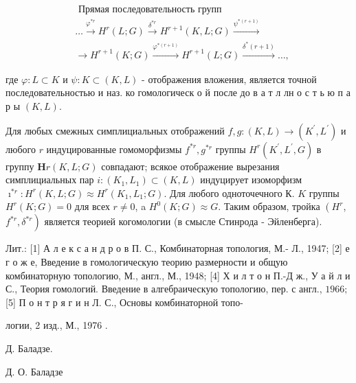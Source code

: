 \documentclass[10pt]{article}
\begin{document}
\[

\begin{aligned}

& \text { Прямая последовательность групп } \\

& \ldots \stackrel{\varphi^{* r}}{\longrightarrow} H^{r}(L ; G) \stackrel{\delta^{* r}}{\longrightarrow} H^{r+1}(K, L ; G) \stackrel{\psi^{*(r+1)}}{\longrightarrow} \\

& \longrightarrow H^{r+1}(K ; G) \stackrel{\varphi^{*(r+1)}}{\longrightarrow} H^{r+1}(L ; G) \stackrel{\delta^{*}(r+1)}{\longrightarrow} \ldots,

\end{aligned}

\]



где $\varphi: L \subset K$ и $\psi: K \subset(K, L)$ - отображения вложения, является точной последовательностью и наз. ко гомологическ о й после до в а т л лн о с т ь ю п а р ы $(K, L)$.



Для любых смежных симплициальных отображений $f, g:(K, L) \rightarrow\left(K^{\prime}, L^{\prime}\right)$ и любого $r$ индуцированные гомоморфизмы $f^{* r}, g^{* r}$ группы $H^{r}\left(K^{\prime}, L^{\prime}, G\right)$ в группу $\boldsymbol{H} r(K, L ; G)$ совпадают; всякое отображение вырезания симплициальных пар $i:\left(K_{1}, L_{1}\right) \subset(K, L)$ индуцирует изоморфизм $\imath^{* r}: H^{r}(K, L ; G) \approx H^{r}\left(K_{1}, L_{1} ; G\right)$. Для любого одноточечного К. $K$ группы $H^{r}(K ; G)=0$ для всех $r \neq 0$, a $H^{0}(K ; G) \approx G$. Таким образом, тройка $\left(H^{r}\right.$, $\left.f^{* r}, \delta^{* r}\right)$ является теорией когомологии (в смысле Стинрода - Эйленберга).



Лит.: [1] А л е к с а н д р о в П. С., Комбинаторная топология, М.- Л., 1947; [2] е г о ж е, Введение в гомологическую теорию размерности и общую комбинаторную топологию, М., англ., М., 1948; [4] Х и л т о н П.-Д ж., У а й л и С., Теория гомологий. Введение в алгебраическую топологию, пер. с англ., $1966 ;$ [5] П о н т р я г и н Л. С., Основы комбинаторной топо-

логии, 2 изд., М., 1976 .

Д. Баладзе.



Д. О. Баладзе
\end{document}

